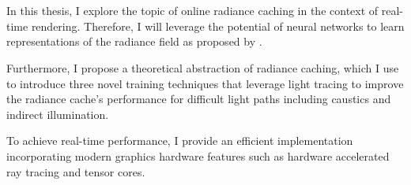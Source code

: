 

\chapter*{}
\label{sec:summary}

In this thesis, I explore the topic of online radiance caching in the context of real-time rendering.
Therefore, I will leverage the potential of neural networks to learn representations of the radiance field as proposed by \textcite{muller2021}.

Furthermore, I propose a theoretical abstraction of radiance caching, which I use to introduce three novel training techniques that leverage light tracing to improve the radiance cache's performance for difficult light paths including caustics and indirect illumination.

To achieve real-time performance, I provide an efficient implementation incorporating modern graphics hardware features such as hardware accelerated ray tracing and tensor cores.